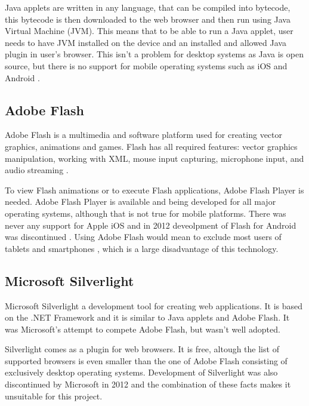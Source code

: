 Java applets are written in any language, that can be compiled into bytecode, this bytecode is then downloaded to the web browser and then run using Java Virtual Machine (JVM). This means that to be able to run a Java applet, user needs to have JVM installed on the device and an installed and allowed Java plugin in user's browser. This isn't a problem for desktop systems as Java is open source, but there is no support for mobile operating systems such as iOS and Android \cite{}. 

\subsection{Adobe Flash}
Adobe Flash is a multimedia and software platform used for creating vector graphics, animations and games. Flash has all required features: vector graphics manipulation, working with XML, mouse input capturing, microphone input, and audio streaming \cite{}. 

To view Flash animations or to execute Flash applications, Adobe Flash Player is needed. Adobe Flash Player is available and being developed for all major operating systems, although that is not true for mobile platforms. There was never any support for Apple iOS \cite{} and in 2012 deveolpment of Flash for Android was discontinued \cite{}. Using Adobe Flash would mean to exclude most users of tablets and smartphones \cite{}, which is a large disadvantage of this technology.

\subsection{Microsoft Silverlight}
Microsoft Silverlight \cite{} a development tool for creating web applications. It is based on the .NET Framework and it is similar to Java applets and Adobe Flash. It was Microsoft's attempt to compete Adobe Flash, but wasn't well adopted.

Silverlight comes as a plugin for web browsers. It is free, altough the list of supported browsers is even smaller \cite{} than the one of Adobe Flash consisting of exclusively desktop operating systems. Development of Silverlight was also discontinued by Microsoft in 2012 and the combination of these facts makes it unsuitable for this project.

